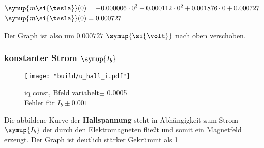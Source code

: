 \begin{align}
   \symup{m\si{\tesla}}(0)&=-0.000006 \cdot 0^3 + 0.000112 \cdot 0^2 + 0.001876 \cdot 0 + 0.000727 \\
   \symup{m\si{\tesla}}(0)&=0.000727
\end{align}

Der Graph ist also um $0.000727$ $\symup{\si{\volt}}$ nach oben verschoben.


\subsubsection{konstanter Strom $\symup{I_b}$}
\label{sec:Auswertung_iconst}

\begin{figure}
   \centering
    \texttt{[image: "build/u\_hall\_i.pdf"]}
    \caption{iq const, Bfeld variabelt$\pm$ 0.0005\\Fehler für $I_b \pm 0.001$}
    \label{fig:Uhall}
 \end{figure}


Die abbildene Kurve der \textbf{Hallspannung} steht in Abhängigkeit zum Strom $\symup{I_b}$ der durch den Elektromagneten fließt und somit ein Magnetfeld erzeugt.
Der Graph ist deutlich stärker Gekrümmt als \ref{fig:Uhall} 








\newpage
